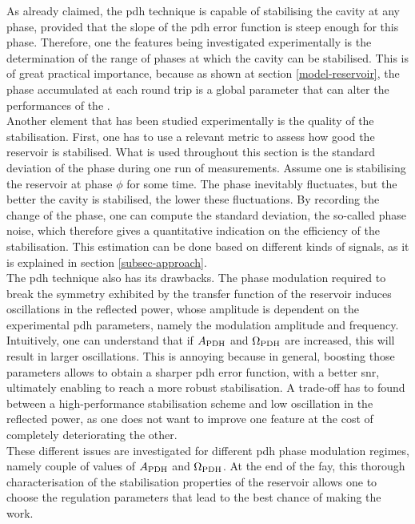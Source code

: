 As already claimed, the \gls{pdh} technique is capable of stabilising the cavity at any phase, provided that the slope of the \gls{pdh} error function is steep enough for this phase. Therefore, one the features being investigated experimentally is the determination of the range of phases at which the cavity can be stabilised. This is of great practical importance, because as shown at section \ref{model-reservoir}, the phase accumulated at each round trip is a global parameter that can alter the performances of the \rcer.\\

Another element that has been studied experimentally is the quality of the stabilisation. First, one has to use a relevant metric to assess how good the reservoir is stabilised. What is used throughout this section is the standard deviation of the phase during one run of measurements. Assume one is stabilising the reservoir at phase $\phi$ for some time. The phase inevitably fluctuates, but the better the cavity is stabilised, the lower these fluctuations. By recording the change of the phase, one can compute the standard deviation, the so-called phase noise, which therefore gives a quantitative indication on the efficiency of the stabilisation. This estimation can be done based on different kinds of signals, as it is explained in section \ref{subsec-approach}.\\

The \gls{pdh} technique also has its drawbacks. The phase modulation required to break the symmetry exhibited by the transfer function of the reservoir induces oscillations in the reflected power, whose amplitude is dependent on the experimental \gls{pdh} parameters, namely the modulation amplitude and frequency. Intuitively, one can understand that if $A_{\text{PDH}}$ and $\Omega_{\text{PDH}}$ are increased, this will result in larger oscillations. This is annoying because in general, boosting those parameters allows to obtain a sharper \gls{pdh} error function, with a better \gls{snr}, ultimately enabling to reach a more robust stabilisation. A trade-off has to found between a high-performance stabilisation scheme and low oscillation in the reflected power, as one does not want to improve one feature at the cost of completely deteriorating the other.\\

These different issues are investigated for different \gls{pdh} phase modulation regimes, namely couple of values of $A_{\text{PDH}}$ and $\Omega_{\text{PDH}}$. At the end of the fay, this thorough characterisation of the stabilisation properties of the reservoir allows one to choose the regulation parameters that lead to the best chance of making the \rcer work.

